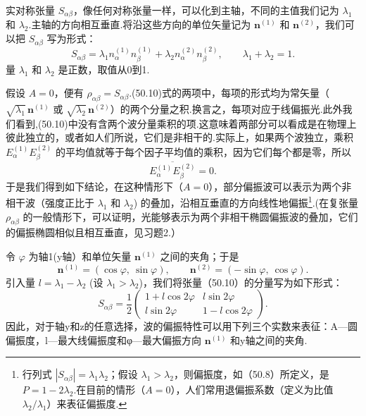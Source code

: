 实对称张量 $S_{\alpha\beta}$，像任何对称张量一样，可以化到主轴，不同的主值我们记为 $\lambda_1$ 和 $\lambda_2$.主轴的方向相互垂直.将沿这些方向的单位矢量记为 $\boldsymbol{n}^{(1)}$ 和 $\boldsymbol{n}^{(2)}$，我们可以把 $S_{\alpha\beta}$ 写为形式：
\begin{equation}
  S_{\alpha\beta}=\lambda_1 n_\alpha^{(1)}n_\beta^{(1)}
  +\lambda_2 n_\alpha^{(2)}n_\beta^{(2)},\qquad
  \lambda_1+\lambda_2=1.
\end{equation}
量 $\lambda_1$ 和 $\lambda_2$ 是正数，取值从0到1.

假设 $A = 0$，便有 $\rho_{\alpha\beta} = S_{\alpha\beta}$.(50.10)式的两项中，每项的形式均为常矢量（$\sqrt{\lambda_1}\,\boldsymbol{n}^{(1)}$ 或 $\sqrt{\lambda_2}\,\boldsymbol{n}^{(2)}$）的两个分量之积.换言之，每项对应于线偏振光.此外我们看到,(50.10)中没有含两个波分量乘积的项.这意味着两部分可以看成是在物理上彼此独立的，或者如人们所说，它们是非相干的.实际上，如果两个波独立，乘积 $E_\alpha^{(1)}E_\beta^{(2)}$ 的平均值就等于每个因子平均值的乘积，因为它们每个都是零，所以
\begin{equation*}
  \overline{E_\alpha^{(1)}E_\beta^{(2)}}=0.
\end{equation*}
于是我们得到如下结论，在这种情形下（$A = 0$），部分偏振波可以表示为两个非相干波（强度正比于 $\lambda_1$ 和 $\lambda_2$) 的叠加，沿相互垂直的方向线性地偏振\footnote{行列式 $|S_{\alpha\beta}|=\lambda_1\lambda_2$；假设 $\lambda_1>\lambda_2$，则偏振度，如（50.8）所定义，是 $P=1-2\lambda_2$.在目前的情形（$A=0$），人们常用退偏振系数（定义为比值 $\lambda_2/\lambda_1$）来表征偏振度.}.(在复张量 $\rho_{\alpha\beta}$ 的一般情形下，可以证明，光能够表示为两个非相干椭圆偏振波的叠加，它们的偏振椭圆相似且相互垂直，见习题2.）

令 $\varphi$ 为轴1(y轴）和单位矢量 $\boldsymbol{n}^{(1)}$ 之间的夹角；于是
\begin{equation*}
  \boldsymbol{n}^{(1)}=(\cos\varphi,\ \sin\varphi),\qquad
  \boldsymbol{n}^{(2)}=(-\sin\varphi,\ \cos\varphi).
\end{equation*}
引入量 $l = \lambda_1 - \lambda_2$ (设 $\lambda_1 > \lambda_2$)，我们将张量（50.10）的分量写为如下形式：
\begin{equation}
  S_{\alpha\beta}=\frac{1}{2}
  \begin{pmatrix}
    1+l\cos 2\varphi & l\sin 2\varphi\\
    l\sin 2\varphi & 1-l\cos 2\varphi
  \end{pmatrix}.
\end{equation}
因此，对于轴y和z的任意选择，波的偏振特性可以用下列三个实数来表征：A—圆偏振度，l—最大线偏振度和φ—最大偏振方向 $\boldsymbol{n}^{(1)}$ 和y轴之间的夹角.


